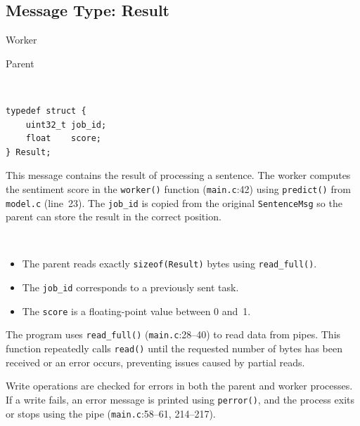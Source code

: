 \documentclass[12pt]{article}
\begin{document}
\subsection{Message Type: Result}

\begin{description}[style=nextline]
  \item[Sender] Worker
  \item[Receiver] Parent
  \item[Encoding]~

\begin{lstlisting}
typedef struct {
    uint32_t job_id;
    float    score;
} Result;
\end{lstlisting}

  \item[Semantics]
    This message contains the result of processing a sentence. The worker
    computes the sentiment score in the \texttt{worker()} function
    (\texttt{main.c}:42) using \texttt{predict()} from \texttt{model.c}
    (line~23). The \texttt{job\_id} is copied from the original
    \texttt{SentenceMsg} so the parent can store the result in the correct
    position.

  \item[Invariants]~
    \begin{itemize}
      \item The parent reads exactly \texttt{sizeof(Result)} bytes using
            \texttt{read\_full()}.
      \item The \texttt{job\_id} corresponds to a previously sent task.
      \item The \texttt{score} is a floating-point value between 0 and~1.
    \end{itemize}

  \item[Error handling]
    The program uses \texttt{read\_full()} (\texttt{main.c}:28--40) to
    read data from pipes. This function repeatedly calls \texttt{read()}
    until the requested number of bytes has been received or an error
    occurs, preventing issues caused by partial reads.

    Write operations are checked for errors in both the parent and worker
    processes. If a write fails, an error message is printed using
    \texttt{perror()}, and the process exits or stops using the pipe
    (\texttt{main.c}:58--61, 214--217).
\end{description}

\end{document}
